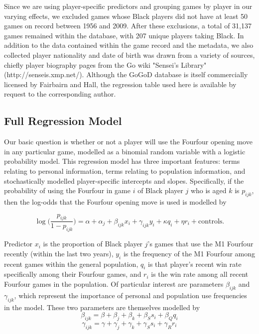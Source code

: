 \documentclass[reqno,12pt]{amsart}
\begin{document}
Since we are using player-specific predictors and grouping games by player in our varying effects, we excluded games whose Black players did not have at least 50 games on record between 1956 and 2009. After these exclusions, a total of 31,137 games remained within the database, with 207 unique players taking Black. In addition to the data contained within the game record and the metadata, we also collected player nationality and date of birth was drawn from a variety of sources, chiefly player biography pages from the Go wiki "Sensei's Library" (http://senseis.xmp.net/). Although the GoGoD database is itself commercially licensed by Fairbairn and Hall, the regression table used here is available by request to the corresponding author.


\subsection{Full Regression Model}

Our basic question is whether or not a player will use the Fourfour opening move in any particular game, modelled as a binomial random variable with a logistic probability model. This regression model has three important features: terms relating to personal information, terms relating to population information, and stochastically modelled player-specific intercepts and slopes. Specifically, if the probability of using the Fourfour in game $i$ of Black player $j$ who is aged $k$ is $p_{ijk}$, then the log-odds that the Fourfour opening move is used is modelled by

\begin{equation} \label{eq:model}
  \log\bigg(\frac{p_{ijk}}{1-p_{ijk}}\bigg) = \alpha + \alpha_j + \beta_{ijk}x_i + \gamma_{ijk}y_i + \kappa q_i + \eta r_i + \textrm{controls}.
\end{equation}

Predictor $x_i$ is the proportion of Black player $j$'s games that use the M1 Fourfour recently (within the last two years), $y_i$ is the frequency of the M1 Fourfour among recent games within the general population, $q_i$ is that player's recent win rate specifically among their Fourfour games, and $r_i$ is the win rate among all recent Fourfour games in the population. Of particular interest are parameters $\beta_{ijk}$ and $\gamma_{ijk}$, which represent the importance of personal and population use frequencies in the model. These two parameters are themselves modelled by
$$
  \beta_{ijk} = \beta + \beta_j + \beta_k + \beta_{S} s_{i} + \beta_{Q} q_{i}
$$
$$
  \gamma_{ijk} = \gamma + \gamma_j + \gamma_k + \gamma_{S} s_{i} + \gamma_{R} r_{i}
$$
\end{document}
